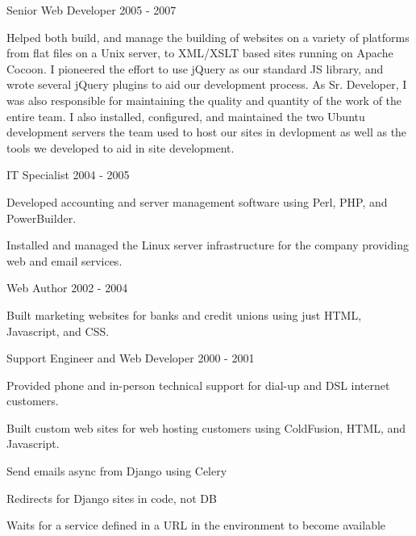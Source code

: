 \documentclass[11pt]{article} %
\begin{document}
\begin{description}
           {Senior Web Developer}
           {2005 - 2007}

Helped both build, and manage the building of websites on a variety of platforms from flat files on a Unix server,
to XML/XSLT based sites running on Apache Cocoon. I pioneered the effort to use jQuery as our standard JS library,
and wrote several jQuery plugins to aid our development process. As Sr. Developer, I was also responsible for
maintaining the quality and quantity of the work of the entire team. I also installed, configured, and maintained
the two Ubuntu development servers the team used to host our sites in devlopment as well as the tools we developed
to aid in site development.

           {IT Specialist}
           {2004 - 2005}

Developed accounting and server management software using Perl, PHP, and PowerBuilder.

Installed and managed the Linux server infrastructure for the company providing web and email services.

           {Web Author}
           {2002 - 2004}

Built marketing websites for banks and credit unions using just HTML, Javascript, and CSS.

           {Support Engineer and Web Developer}
           {2000 - 2001}

Provided phone and in-person technical support for dial-up and DSL internet customers.

Built custom web sites for web hosting customers using ColdFusion, HTML, and Javascript.

\end{description}


        {}
        {Send emails async from Django using Celery}

        {}
        {Redirects for Django sites in code, not DB}

        {}
        {Waits for a service defined in a URL in the environment to become available}
\end{document}
